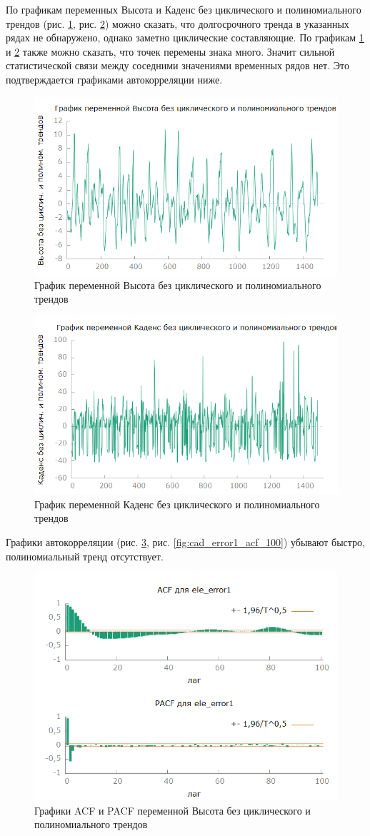 \documentclass[a4paper,12pt]{article}
\begin{document}
По графикам переменных Высота и Каденс без циклического и полиномиального трендов (рис. \ref{fig:ele_error1}, рис. \ref{fig:cad_error1}) можно сказать, что долгосрочного тренда в указанных рядах не обнаружено, однако заметно циклические составляющие. По графикам \ref{fig:ele_error1} и \ref{fig:cad_error1} также можно сказать, что точек перемены знака много. Значит сильной статистической связи между соседними значениями временных рядов нет. Это подтверждается графиками автокорреляции ниже.

\begin{figure}[H]
	\centering
	\includegraphics[width=0.5\linewidth]{../[graphics]/ele_error1.png}
	\caption{График переменной Высота без циклического и полиномиального трендов}
	\label{fig:ele_error1}
\end{figure}

\begin{figure}[H]
	\centering
	\includegraphics[width=0.5\linewidth]{../[graphics]/cad_error1.png}
	\caption{График переменной Каденс без циклического и полиномиального трендов}
	\label{fig:cad_error1}
\end{figure}

Графики автокорреляции (рис. \ref{fig:ele_error1_acf_100}, рис. \ref{fig:cad_error1_acf_100}) убывают быстро, полиномиальный тренд отсутствует.

\begin{figure}[H]
	\centering
	\includegraphics[width=0.5\linewidth]{../[graphics]/ele_error1_acf_100.png}
	\caption{Графики ACF и PACF переменной Высота без циклического и полиномиального трендов}
	\label{fig:ele_error1_acf_100}
\end{figure}
\end{document}
